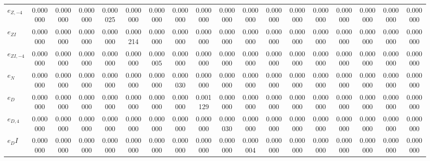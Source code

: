 \begin{center}
\begin{longtable}{lccccccccccccccccc}
${e_{Z,-4}}    $	 & 	        0.000000	 & 	        0.000000	 & 	        0.000000	 & 	        0.000025	 & 	        0.000000	 & 	        0.000000	 & 	        0.000000	 & 	        0.000000	 & 	        0.000000	 & 	        0.000000	 & 	        0.000000	 & 	        0.000000	 & 	        0.000000	 & 	        0.000000	 & 	        0.000000	 & 	        0.000000	 & 	        0.000000 \\ 
${e_{ZI}}      $	 & 	        0.000000	 & 	        0.000000	 & 	        0.000000	 & 	        0.000000	 & 	        0.000214	 & 	        0.000000	 & 	        0.000000	 & 	        0.000000	 & 	        0.000000	 & 	        0.000000	 & 	        0.000000	 & 	        0.000000	 & 	        0.000000	 & 	        0.000000	 & 	        0.000000	 & 	        0.000000	 & 	        0.000000 \\ 
${e_{ZI,-4}}   $	 & 	        0.000000	 & 	        0.000000	 & 	        0.000000	 & 	        0.000000	 & 	        0.000000	 & 	        0.000005	 & 	        0.000000	 & 	        0.000000	 & 	        0.000000	 & 	        0.000000	 & 	        0.000000	 & 	        0.000000	 & 	        0.000000	 & 	        0.000000	 & 	        0.000000	 & 	        0.000000	 & 	        0.000000 \\ 
${e_N}         $	 & 	        0.000000	 & 	        0.000000	 & 	        0.000000	 & 	        0.000000	 & 	        0.000000	 & 	        0.000000	 & 	        0.000030	 & 	        0.000000	 & 	        0.000000	 & 	        0.000000	 & 	        0.000000	 & 	        0.000000	 & 	        0.000000	 & 	        0.000000	 & 	        0.000000	 & 	        0.000000	 & 	        0.000000 \\ 
${e_D}         $	 & 	        0.000000	 & 	        0.000000	 & 	        0.000000	 & 	        0.000000	 & 	        0.000000	 & 	        0.000000	 & 	        0.000000	 & 	        0.001129	 & 	        0.000000	 & 	        0.000000	 & 	        0.000000	 & 	        0.000000	 & 	        0.000000	 & 	        0.000000	 & 	        0.000000	 & 	        0.000000	 & 	        0.000000 \\ 
${e_{D,4}}     $	 & 	        0.000000	 & 	        0.000000	 & 	        0.000000	 & 	        0.000000	 & 	        0.000000	 & 	        0.000000	 & 	        0.000000	 & 	        0.000000	 & 	        0.000030	 & 	        0.000000	 & 	        0.000000	 & 	        0.000000	 & 	        0.000000	 & 	        0.000000	 & 	        0.000000	 & 	        0.000000	 & 	        0.000000 \\ 
${e_DI}        $	 & 	        0.000000	 & 	        0.000000	 & 	        0.000000	 & 	        0.000000	 & 	        0.000000	 & 	        0.000000	 & 	        0.000000	 & 	        0.000000	 & 	        0.000000	 & 	        0.000004	 & 	        0.000000	 & 	        0.000000	 & 	        0.000000	 & 	        0.000000	 & 	        0.000000	 & 	        0.000000	 & 	        0.000000 \\ 

\end{longtable}
\end{center}
